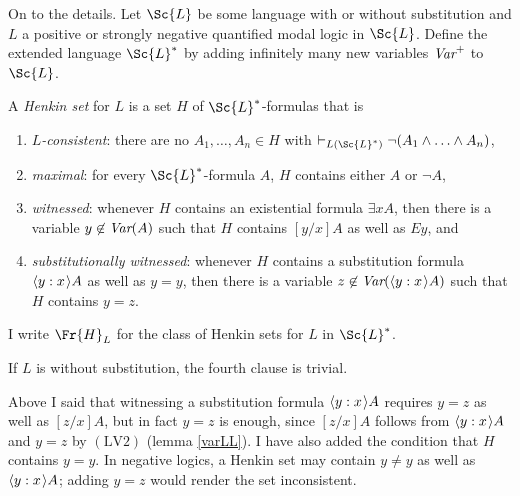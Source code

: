 \documentclass[11pt]{woarticle}
\theoremstyle{break}
\theoremstyle{nonumberplain}
\newcommand{\1}{\;\,|\;\,}
\newcommand{\var}{\emph{Var}}
\renewcommand{\t}[1]{\ensuremath{\langle #1  \makebox[.2ex]{}\rangle}}
\newcommand{\T}[1]{\ensuremath{(\mathrm{ #1})}}
\begin{document}
On to the details. Let $\Sc{L}$ be some language with or without substitution
and $L$ a positive or strongly negative quantified modal logic in $\Sc{L}$.
Define the extended language $\Sc{L}^*$ by adding infinitely many new variables
$\emph{Var}^+$ to $\Sc{L}$.

\begin{definition}

  A \emph{Henkin set} for $L$ is a set $H$ of $\Sc{L}^*$-formulas that
  is
  \begin{enumerate}

  \item \emph{$L$-consistent}: there are no $A_1,\ldots,A_n \in H$
    with $\vdash_{L(\Sc{L}^*)} \neg (A_1 \land \ldots \land A_n)$,

  \item \emph{maximal}: for every $\Sc{L}^*$-formula $A$, $H$ contains
    either $A$ or $\neg A$,

  \item \emph{witnessed}: whenever $H$ contains an existential formula
    $\exists x A$, then there is a variable $y \not\in \var(A)$ such
    that $H$ contains $[y/x]A$ as well as $Ey$, and

  \item \emph{substitutionally witnessed}: whenever $H$ contains a
    substitution formula $\t{y:x} A$ as well as $y\!=\!y$, then there
    is a variable $z \not\in \var(\t{y:x}A)$ such that $H$ contains
    $y\!=\!z$.

  \end{enumerate}

  I write $\Fr{H}_L$ for the class of Henkin sets for $L$ in $\Sc{L}^*$.
\end{definition}

If $L$ is without substitution, the fourth clause is trivial.  

Above I said that witnessing a substitution formula $\t{y:x}A$ requires
$y\!=\!z$ as well as $[z/x]A$, but in fact $y\!=\!z$ is enough, since $[z/x]A$
follows from $\t{y:x}A$ and $y\!=\!z$ by \T{LV2} (lemma \ref{varLL}). I have
also added the condition that $H$ contains $y\!=\!y$. In negative logics, a
Henkin set may contain $y\!\not=\!y$ as well as $\t{y:x}A$; adding $y\!=\!z$
would render the set inconsistent.
\end{document}
